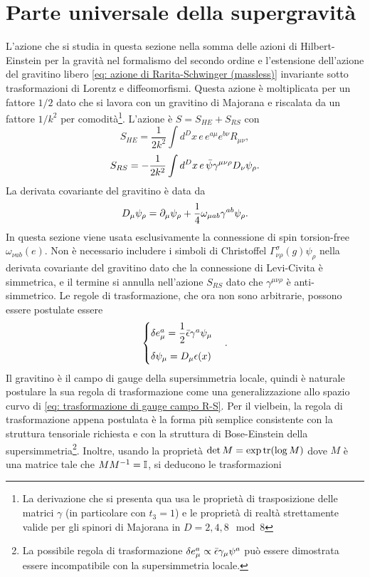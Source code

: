 \section{Parte universale della supergravità}
L'azione che si studia in questa sezione nella somma delle azioni di Hilbert-Einstein per la gravità nel formalismo del secondo ordine e l'estensione dell'azione del gravitino libero \eqref{eq: azione di Rarita-Schwinger (massless)} invariante sotto trasformazioni di Lorentz e diffeomorfismi. Questa azione è moltiplicata per un fattore $1/2$ dato che si lavora con un gravitino di Majorana e riscalata da un fattore $1/k^2$ per comodità\footnote{La derivazione che si presenta qua usa le proprietà di trasposizione delle matrici $\gamma$ (in particolare con $t_3 = 1$) e le proprietà di realtà strettamente valide per gli spinori di Majorana in $D = 2, 4, 8\mod{8}$}. L'azione è $S = S_{HE} + S_{RS}$ con 
\begin{equation}
    S_{HE} = \frac{1}{2k^2}\int d^Dx\,e\,e^{a\mu}e^{b\nu}R_{\mu\nu},    
\end{equation}
\begin{equation}
    S_{RS} = -\frac{1}{2k^2}\int d^Dx\,e\,\bar{\psi}\gamma^{\mu\nu\rho}D_\nu\psi_\rho.
\end{equation}
La derivata covariante del gravitino è data da 
\begin{equation}
    D_\mu\psi_\rho = \partial_\mu\psi_\rho + \frac{1}{4}\omega_{\mu ab}\gamma^{ab}\psi_\rho.
\end{equation}
In questa sezione viene usata esclusivamente la connessione di spin torsion-free $\omega_{\nu ab}(e)$. Non è necessario includere i simboli di Christoffel $\Gamma^{\sigma}_{\nu\rho}(g)\psi_\rho$ nella derivata covariante del gravitino dato che la connessione di Levi-Civita è simmetrica, e il termine si annulla nell'azione $S_{RS}$ dato che $\gamma^{\mu\nu\rho}$ è anti-simmetrico. Le regole di trasformazione, che ora non sono arbitrarie, possono essere postulate essere
\begin{equation}
\label{eq: regole trasformazione SG vielbein + gravitino}
    \begin{cases}
        \delta e_\mu^a = \dfrac{1}{2}\bar{\epsilon}\gamma^a\psi_\mu \\[2ex]
        \delta\psi_\mu = D_\mu\epsilon(x)
    \end{cases}.
\end{equation}
Il gravitino è il campo di gauge della supersimmetria locale, quindi è naturale postulare la sua regola di trasformazione come una generalizzazione allo spazio curvo di \eqref{eq: trasformazione di gauge campo R-S}. Per il vielbein, la regola di trasformazione appena postulata è la forma più semplice consistente con la struttura tensoriale richiesta e con la struttura di Bose-Einstein della supersimmetria\footnote{La possibile regola di trasformazione $\delta e^a_\mu \propto \bar{\epsilon}\gamma_\mu\psi^a$ può essere dimostrata essere incompatibile con la supersimmetria locale.}. Inoltre, usando la proprietà $\det{M} = \exp{\mathrm{tr}{(\log{M})}}$ dove $M$ è una matrice tale che $MM^{-1} = \mathbb{I}$, si deducono le trasformazioni 
